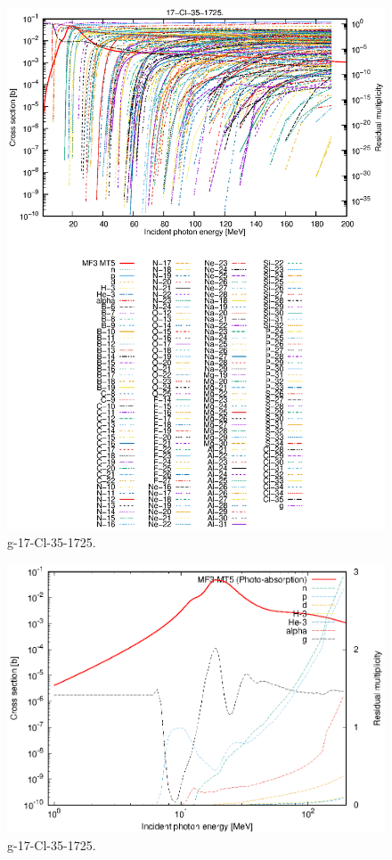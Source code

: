 \begin{figure}
 \includegraphics[width=\linewidth]{eps/g_17-Cl-35_1725.eps}
  \caption{g-17-Cl-35-1725.}
\end{figure}
\newpage \clearpage

\begin{figure}
 \includegraphics[width=\linewidth]{eps-log/g_17-Cl-35_1725.eps}
 \caption{g-17-Cl-35-1725.}
\end{figure}
\newpage \clearpage

